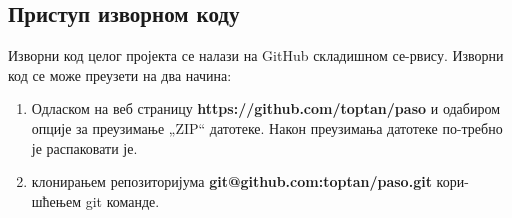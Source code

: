 \documentclass[a4paper, 12pt, diplomski]{etfcyr}
\def\quote#1{„#1“}
\begin{document}
			\subsection{Приступ изворном коду}
				\begin{justify}
					Изворни код целог пројекта се налази на GitHub складишном се-рвису. Изворни код се може преузети на два начина:
					\begin{enumerate}[noitemsep]
						\item Одласком на веб страницу \textbf{https://github.com/toptan/paso} и одабиром опције за преузимање \quote{ZIP} датотеке. Након преузимања датотеке по-требно је распаковати је.
						\item клонирањем репозиторијума \textbf{git@github.com:toptan/paso.git} кори-шћењем git команде.
					\end{enumerate}
				\end{justify}
\end{document}
